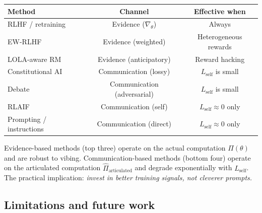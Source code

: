 \documentclass[11pt,a4paper]{article}
\begin{document}
\begin{center}
\begin{tabular}{@{}lcc@{}}
\toprule
\textbf{Method} & \textbf{Channel} & \textbf{Effective when} \\
\midrule
RLHF / retraining & Evidence ($\nabla_\theta$) & Always \\
EW-RLHF & Evidence (weighted) & Heterogeneous rewards \\
LOLA-aware RM & Evidence (anticipatory) & Reward hacking \\
Constitutional AI & Communication (lossy) & $L_{\mathrm{self}}$ is small \\
Debate & Communication (adversarial) & $L_{\mathrm{self}}$ is small \\
RLAIF & Communication (self) & $L_{\mathrm{self}} \approx 0$ only \\
Prompting / instructions & Communication (direct) & $L_{\mathrm{self}} \approx 0$ only \\
\bottomrule
\end{tabular}
\end{center}

Evidence-based methods (top three) operate on the actual computation $\Pi(\theta)$ and are robust to vibing. Communication-based methods (bottom four) operate on the articulated computation $\hat{\Pi}_{\mathrm{articulated}}$ and degrade exponentially with $L_{\mathrm{self}}$. The practical implication: \emph{invest in better training signals, not cleverer prompts.}

\subsection{Limitations and future work}
\end{document}
